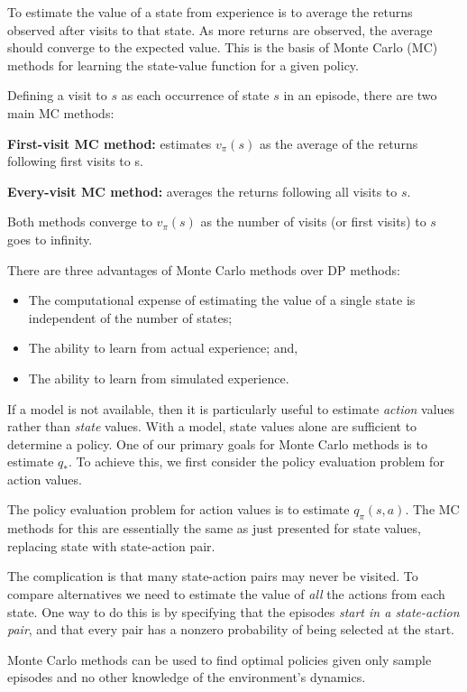 \documentclass{article}
\providecommand{\tightlist}{%
  \setlength{\itemsep}{0pt}\setlength{\parskip}{0pt}}
\begin{document}
To estimate the value of a state from experience is to
average the returns observed after visits to that state. As more returns
are observed, the average should converge to the expected value. This is the basis of Monte Carlo (MC) methods for learning the state-value function for a given policy.

Defining a visit to \(s\) as each occurrence of state \(s\) in an episode, there are two main MC methods:

\textbf{First-visit MC method:} estimates \(v_\pi(s)\) as the average of
the returns following first visits to s.

\textbf{Every-visit MC method:} averages the returns following all
visits to \(s\).

Both methods converge to \(v_\pi(s)\) as the number of visits (or first
visits) to \(s\) goes to infinity.

There are three advantages of Monte Carlo methods over DP methods:

\begin{itemize}
\tightlist
\item
  The computational expense of estimating the value of a single state is
  independent of the number of states;
\item
  The ability to learn from actual experience; and,
\item
  The ability to learn from simulated experience.
\end{itemize}

If a model is not available, then it is particularly useful to estimate
\emph{action} values rather than \emph{state} values. With a model,
state values alone are sufficient to determine a policy. One of our
primary goals for Monte Carlo methods is to estimate \(q_*\). To achieve
this, we first consider the policy evaluation problem for action values.

The policy evaluation problem for action values is to estimate
\(q_\pi(s,a)\). The MC methods for this are essentially the same as just
presented for state values, replacing state with state-action pair.

The complication is that many state-action pairs may never be visited.
To compare alternatives we need to estimate the value of \emph{all} the
actions from each state. One way to do this is by specifying that the episodes \emph{start in a state-action pair}, and that every pair has a nonzero probability of being selected at the start.

Monte Carlo methods can be used to find optimal policies given only
sample episodes and no other knowledge of the environment's dynamics.
\end{document}
